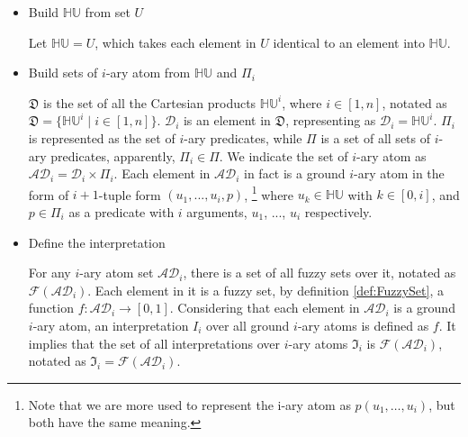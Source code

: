 \documentclass[Thesis.tex]{subfiles}
\begin{document}
\begin{itemize}

\item Build $\mathbb{HU}$ from set $U$

Let $\mathbb{HU} = U$, which takes each element in $U$ identical to an element into $\mathbb{HU}$. 

\item Build sets of $i$-ary atom from $\mathbb{HU}$ and $\Pi_i$

$\mathfrak{D}$ is the set of all the Cartesian products $\mathbb{HU}^{i}$, where $i \in [1,n]$, notated as $\mathfrak{D} = \{\mathbb{HU}^{i} \mid i \in [1,n]\}$. $\mathcal{D}_i$ is an element in $\mathfrak{D}$, representing as $\mathcal{D}_i=\mathbb{HU}^{i}$. $\Pi_i$ is represented as the set of $i$-ary predicates, while $\Pi$ is a set of all sets of $i$-ary predicates, apparently, $\Pi_i \in \Pi$. We indicate the set of $i$-ary atom as $\mathcal{AD}_i = \mathcal{D}_i \times \Pi_i$. Each element in $\mathcal{AD}_i$ in fact is a ground $i$-ary atom in the form of $i+1$-tuple form $(u_1,...,u_i,p)$, \footnote{Note that we are more used to represent the i-ary atom as $p(u_1, \dots, u_i)$, but both have the same meaning.} where $u_k \in \mathbb{HU}$ with $k \in [0,i]$, and $p \in \Pi_i$ as a predicate with $i$ arguments, $u_1$, ..., $u_i$ respectively. 

\item Define the interpretation

For any $i$-ary atom set $\mathcal{AD}_i$, there is a set of all fuzzy sets over it, notated as $\mathcal{F}(\mathcal{AD}_i)$. Each element in it is a fuzzy set, by definition \ref{def:FuzzySet}, a function $f: \mathcal{AD}_i \rightarrow [0,1]$. Considering that each element in $\mathcal{AD}_i$ is a ground $i$-ary atom, an interpretation $I_i$ over all ground $i$-ary atoms is defined as $f$. It implies that the set of all interpretations over $i$-ary atoms $\mathfrak{I}_i$ is $\mathcal{F}(\mathcal{AD}_i)$, notated as $\mathfrak{I}_i = \mathcal{F}(\mathcal{AD}_i)$.
 
\end{itemize}
\end{document}
